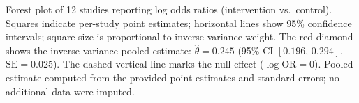 \caption{Forest plot of 12 studies reporting log odds ratios (intervention vs.\ control).
Squares indicate per-study point estimates; horizontal lines show 95\% confidence intervals;
square size is proportional to inverse-variance weight.
The red diamond shows the inverse-variance pooled estimate:
$\hat{\theta} = 0.245$ (95\% CI $[0.196,\, 0.294]$, $\mathrm{SE}=0.025$).
The dashed vertical line marks the null effect ($\log\mathrm{OR}=0$).
Pooled estimate computed from the provided point estimates and standard errors; no additional data were imputed.}
